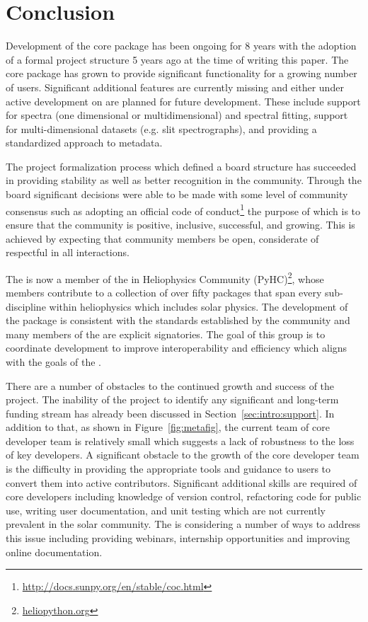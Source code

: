 \section{Conclusion}
\label{sec:conclusion}
Development of the \sunpypkg core package has been ongoing for 8 years with the adoption of a formal project structure 5 years ago at the time of writing this paper.
The core package has grown to provide significant functionality for a growing number of users.
Significant additional features are currently missing and either under active development on are planned for future development.
These include support for spectra (one dimensional or multidimensional) and spectral fitting, support for multi-dimensional datasets (e.g. slit spectrographs), and providing a standardized approach to metadata.

The project formalization process which defined a board structure has succeeded in providing stability as well as better recognition in the community.
Through the board significant decisions were able to be made with some level of community consensus such as adopting an official code of conduct\footnote{\url{http://docs.sunpy.org/en/stable/coc.html}} the purpose of which is to ensure that the \sunpy community is positive, inclusive, successful, and growing.
This is achieved by expecting that community members be open, considerate of respectful in all interactions.

The \sunpyproj is now a member of the \python in Heliophysics Community (PyHC)\footnote{\url{heliopython.org}}, whose members contribute to a collection of over fifty \python packages that span every sub-discipline within heliophysics which includes solar physics. The development of the \sunpy package is consistent with the standards established by the community \citep{pyhcStandards} and many members of
the \sunpyproj are explicit signatories. The goal of this group is to coordinate \python development to improve interoperability and efficiency which aligns with the goals of the  \sunpyproj.

There are a number of obstacles to the continued growth and success of the project. The inability of the project to identify any significant and long-term funding stream has already been discussed in Section~\ref{sec:intro:support}. In addition to that, as shown in Figure~\ref{fig:metafig}, the current team of core developer team is relatively small which suggests a lack of robustness to the loss of key developers.
A significant obstacle to the growth of the core developer team is the difficulty in providing the appropriate tools and guidance to users to convert them into active contributors.
Significant additional skills are required of core developers including knowledge of version control,  refactoring code for public use, writing user documentation, and unit testing which are not currently prevalent in the solar community.
The \sunpyproj is considering a number of ways to address this issue including providing webinars, internship opportunities and improving online documentation.

